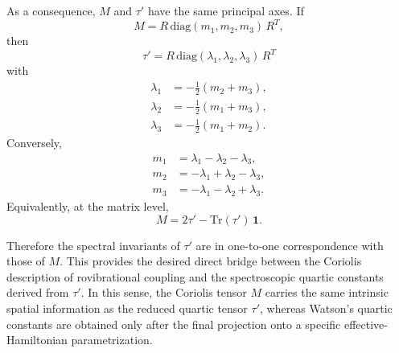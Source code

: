 As a consequence, $M$ and $\tau'$ have the same principal axes.  If
\begin{equation}
M = R\,\mathrm{diag}(m_1,m_2,m_3)\,R^T,
\end{equation}
then
\begin{equation}
\tau' = R\,\mathrm{diag}(\lambda_1,\lambda_2,\lambda_3)\,R^T
\end{equation}
with
\begin{align}
\lambda_1 &= -\frac12(m_2+m_3),\\
\lambda_2 &= -\frac12(m_1+m_3),\\
\lambda_3 &= -\frac12(m_1+m_2).
\label{eq:lambda_from_m}
\end{align}
Conversely,
\begin{align}
m_1 &= \lambda_1-\lambda_2-\lambda_3,\\
m_2 &= -\lambda_1+\lambda_2-\lambda_3,\\
m_3 &= -\lambda_1-\lambda_2+\lambda_3.
\label{eq:m_from_lambda}
\end{align}
Equivalently, at the matrix level,
\begin{equation}
M = 2\tau' - \mathrm{Tr}(\tau')\,\mathbf 1.
\label{eq:M_from_tauprime_matrix}
\end{equation}

Therefore the spectral invariants of $\tau'$ are in one-to-one
correspondence with those of $M$.  This provides the desired direct bridge
between the Coriolis description of rovibrational coupling and the spectroscopic
quartic constants derived from $\tau'$.  In this sense, the Coriolis tensor
$M$ carries the same intrinsic spatial information as the reduced quartic tensor
$\tau'$, whereas Watson's quartic constants are obtained only after the final
projection onto a specific effective-Hamiltonian parametrization.
